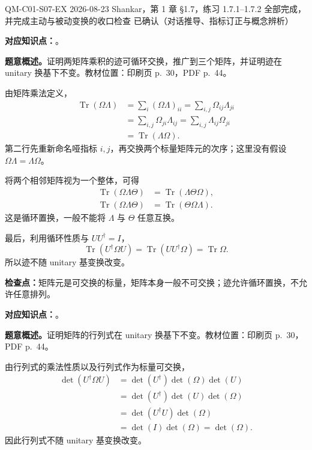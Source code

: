 \exercisemeta
  {QM-C01-S07-EX}
  {2026-08-23}
  {Shankar，第 1 章 \S 1.7，练习 1.7.1--1.7.2}
  {全部完成，并完成主动与被动变换的收口检查}
  {已确认（对话推导、指标订正与概念辨析）}


\textbf{对应知识点：}。

\textbf{题意概述。}证明两矩阵乘积的迹可循环交换，推广到三个矩阵，并证明迹在 unitary 换基下不变。教材位置：印刷页 p.~30，PDF p.~44。

\begin{checkedsolution}
由矩阵乘法定义，
\begin{align*}
  \operatorname{Tr}(\Omega\Lambda)
  &=\sum_i(\Omega\Lambda)_{ii}
    =\sum_{i,j}\Omega_{ij}\Lambda_{ji}\\
  &=\sum_{i,j}\Omega_{ji}\Lambda_{ij}
    =\sum_{i,j}\Lambda_{ij}\Omega_{ji}\\
  &=\operatorname{Tr}(\Lambda\Omega).
\end{align*}
第二行先重新命名哑指标 $i,j$，再交换两个标量矩阵元的次序；这里没有假设 $\Omega\Lambda=\Lambda\Omega$。

将两个相邻矩阵视为一个整体，可得
\begin{align*}
  \operatorname{Tr}(\Omega\Lambda\Theta)
  &=\operatorname{Tr}(\Lambda\Theta\Omega),\\
  \operatorname{Tr}(\Omega\Lambda\Theta)
  &=\operatorname{Tr}(\Theta\Omega\Lambda).
\end{align*}
这是循环置换，一般不能将 $\Lambda$ 与 $\Theta$ 任意互换。

最后，利用循环性质与 $UU^\dagger=I$，
\[
  \operatorname{Tr}(U^\dagger\Omega U)
  =\operatorname{Tr}(UU^\dagger\Omega)
  =\operatorname{Tr}\Omega.
\]
所以迹不随 unitary 基变换改变。
\end{checkedsolution}

\textbf{检查点：}矩阵元是可交换的标量，矩阵本身一般不可交换；迹允许循环置换，不允许任意排列。


\textbf{对应知识点：}。

\textbf{题意概述。}证明矩阵的行列式在 unitary 换基下不变。教材位置：印刷页 p.~30，PDF p.~44。

\begin{checkedsolution}
由行列式的乘法性质以及行列式作为标量可交换，
\begin{align*}
  \det(U^\dagger\Omega U)
  &=\det(U^\dagger)\det(\Omega)\det(U)\\
  &=\det(U^\dagger)\det(U)\det(\Omega)\\
  &=\det(U^\dagger U)\det(\Omega)\\
  &=\det(I)\det(\Omega)
   =\det(\Omega).
\end{align*}
因此行列式不随 unitary 基变换改变。
\end{checkedsolution}

